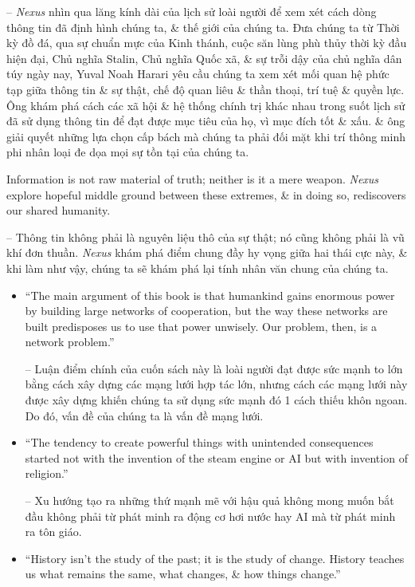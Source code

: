 \documentclass{article}
\begin{document}
\begin{enumerate}
    -- {\it Nexus} nhìn qua lăng kính dài của lịch sử loài người để xem xét cách dòng thông tin đã định hình chúng ta, \& thế giới của chúng ta. Đưa chúng ta từ Thời kỳ đồ đá, qua sự chuẩn mực của Kinh thánh, cuộc săn lùng phù thủy thời kỳ đầu hiện đại, Chủ nghĩa Stalin, Chủ nghĩa Quốc xã, \& sự trỗi dậy của chủ nghĩa dân túy ngày nay, {\sc Yuval Noah Harari} yêu cầu chúng ta xem xét mối quan hệ phức tạp giữa thông tin \& sự thật, chế độ quan liêu \& thần thoại, trí tuệ \& quyền lực. Ông khám phá cách các xã hội \& hệ thống chính trị khác nhau trong suốt lịch sử đã sử dụng thông tin để đạt được mục tiêu của họ, vì mục đích tốt \& xấu. \& ông giải quyết những lựa chọn cấp bách mà chúng ta phải đối mặt khi trí thông minh phi nhân loại đe dọa mọi sự tồn tại của chúng ta.

    Information is not raw material of truth; neither is it a mere weapon. {\it Nexus} explore hopeful middle ground between these extremes, \& in doing so, rediscovers our shared humanity.

    -- Thông tin không phải là nguyên liệu thô của sự thật; nó cũng không phải là vũ khí đơn thuần. {\it Nexus} khám phá điểm chung đầy hy vọng giữa hai thái cực này, \& khi làm như vậy, chúng ta sẽ khám phá lại tính nhân văn chung của chúng ta.
    \begin{itemize}
        \item ``The main argument of this book is that humankind gains enormous power by building large networks of cooperation, but the way these networks are built predisposes us to use that power unwisely. Our problem, then, is a network problem.''

        -- Luận điểm chính của cuốn sách này là loài người đạt được sức mạnh to lớn bằng cách xây dựng các mạng lưới hợp tác lớn, nhưng cách các mạng lưới này được xây dựng khiến chúng ta sử dụng sức mạnh đó 1 cách thiếu khôn ngoan. Do đó, vấn đề của chúng ta là vấn đề mạng lưới.

        \item ``The tendency to create powerful things with unintended consequences started not with the invention of the steam engine or AI but with invention of religion.''

        -- Xu hướng tạo ra những thứ mạnh mẽ với hậu quả không mong muốn bắt đầu không phải từ phát minh ra động cơ hơi nước hay AI mà từ phát minh ra tôn giáo.

        \item ``History isn't the study of the past; it is the study of change. History teaches us what remains the same, what changes, \& how things change.''


\end{itemize}
\end{enumerate}
\end{document}
